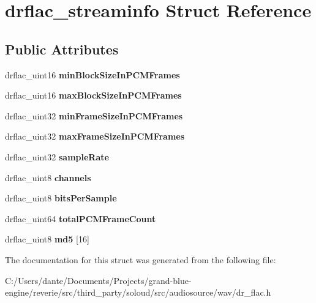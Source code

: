 \hypertarget{structdrflac__streaminfo}{}\section{drflac\+\_\+streaminfo Struct Reference}
\label{structdrflac__streaminfo}
\subsection*{Public Attributes}
\begin{DoxyCompactItemize}
\item 
\mbox{\label{structdrflac__streaminfo_ae23901b3475a5a1cc1c352263e439b0c}} 
drflac\+\_\+uint16 {\bfseries min\+Block\+Size\+In\+P\+C\+M\+Frames}
\item 
\mbox{\label{structdrflac__streaminfo_a23a35f161c9aab1b65654272175b3020}} 
drflac\+\_\+uint16 {\bfseries max\+Block\+Size\+In\+P\+C\+M\+Frames}
\item 
\mbox{\label{structdrflac__streaminfo_a351d7511e24823bcea65456a300ea675}} 
drflac\+\_\+uint32 {\bfseries min\+Frame\+Size\+In\+P\+C\+M\+Frames}
\item 
\mbox{\label{structdrflac__streaminfo_abc0bb267b7aff3e042049cb9353802ac}} 
drflac\+\_\+uint32 {\bfseries max\+Frame\+Size\+In\+P\+C\+M\+Frames}
\item 
\mbox{\label{structdrflac__streaminfo_a28becd2dbabf6540dbcbe85edbaa76e2}} 
drflac\+\_\+uint32 {\bfseries sample\+Rate}
\item 
\mbox{\label{structdrflac__streaminfo_a74dbd7ad0178e57d1449f5215ba154ac}} 
drflac\+\_\+uint8 {\bfseries channels}
\item 
\mbox{\label{structdrflac__streaminfo_ad17d8d915075a873f98defdcdcf709b8}} 
drflac\+\_\+uint8 {\bfseries bits\+Per\+Sample}
\item 
\mbox{\label{structdrflac__streaminfo_a95692d2d333d43910c59d55d17f0cae6}} 
drflac\+\_\+uint64 {\bfseries total\+P\+C\+M\+Frame\+Count}
\item 
\mbox{\label{structdrflac__streaminfo_ad68ebae74dffde9d41acfe4218f23dba}} 
drflac\+\_\+uint8 {\bfseries md5} \mbox{[}16\mbox{]}
\end{DoxyCompactItemize}


The documentation for this struct was generated from the following file\+:\begin{DoxyCompactItemize}
\item 
C\+:/\+Users/dante/\+Documents/\+Projects/grand-\/blue-\/engine/reverie/src/third\+\_\+party/soloud/src/audiosource/wav/dr\+\_\+flac.\+h\end{DoxyCompactItemize}
